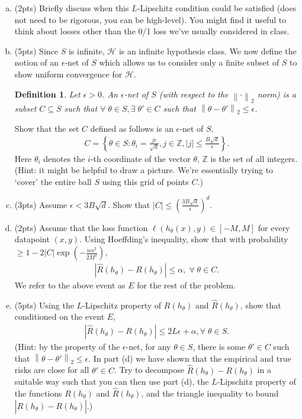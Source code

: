 \documentclass[11pt]{article}
\newcommand{\calH}{{\mathcal{H}}}
\newcommand{\blue}[1]{{\color{blue}#1}}
\newcommand{\twonorm}[1]{\left\| #1\right\|_2}
\newtheorem{definition}[theorem]{Definition}
\begin{document}
\begin{enumerate}[(a)]
    \item (\blue{2pts})  Briefly discuss when this $L$-Lipschitz condition could be satisfied (does not need to be rigorous, you can be high-level). You might find it useful to think about losses other than the 0/1 loss we've usually considered in class. 
    \item (\blue{5pts}) Since $S$ is infinite, $\calH$ is an infinite hypothesis class. We now define the notion of an $\epsilon$-net of $S$ which allows us to consider only a finite subset of $S$ to show uniform convergence for $\calH$.
    \begin{definition}
    Let $\epsilon>0$. An $\epsilon$-net of $S$ (with respect to the $\twonorm{\cdot}$ norm) is a subset $C \subseteq S$ such that $\forall \; \theta \in S, \exists \; \theta' \in C$ such that $\twonorm{\theta-\theta'}\le \epsilon$.
    \end{definition}
    Show that the set $C$ defined as follows is an $\epsilon$-net of $S$,
    \begin{align*}
        C=\left\{ \theta \in S: \theta_i = \frac{j\epsilon}{\sqrt{d}}, j \in \mathbb{Z}, |j|\le \frac{B\sqrt{d}}{\epsilon} \right\} .
    \end{align*}
    Here $\theta_i$ denotes the $i$-th coordinate of the vector $\theta$, $\mathbb{Z}$ is the set of all integers. (Hint: it might be helpful to draw a picture. We're essentially trying to `cover' the entire ball $S$ using this grid of points $C$.)
    \item (\blue{3pts}) Assume $\epsilon<3B\sqrt{d}$. Show that $|C|\le \left(\frac{3B\sqrt{d}}{\epsilon}\right)^d$. 
    \item (\blue{2pts}) Assume that the loss function $\ell(h_{\theta}(x),y)\in [-M,M]$ for every datapoint $(x,y)$. Using Hoeffding's inequality, show that with probability $\ge 1-2|C|\exp\left(-\frac{n\alpha^2}{2M^2} \right)$,
    \begin{align*}
        |\hat{R}(h_{\theta})-R(h_{\theta})| \le \alpha, \; \forall \; \theta\in C.
    \end{align*}
    We refer to the above event as $E$ for the rest of the problem.
    \item (\blue{5pts}) Using the $L$-Lipschitz property of $R(h_{\theta})$ and $\hat{R}(h_{\theta})$, show that conditioned on the event $E$,
    \begin{align}
     |\hat{R}(h_{\theta})-R(h_{\theta})| \le 2L\epsilon+\alpha, \forall \; \theta \in S.
    \end{align}
    (Hint: by the property of the $\epsilon$-net, for any $\theta \in S$, there is some $\theta' \in C$ such that $\twonorm{\theta-\theta'}\le \epsilon$. In part (d) we have shown that the empirical and true risks are close for all $\theta' \in C$. Try to decompose $\hat{R}(h_{\theta})-R(h_{\theta})$ in a suitable way such that you can then use part (d), the $L$-Lipschitz property of the functions $R(h_\theta)$ and $\hat{R}(h_\theta)$, and the triangle inequality to bound $|\hat{R}(h_{\theta})-R(h_{\theta})|$.)
    

\end{enumerate}
\end{document}
